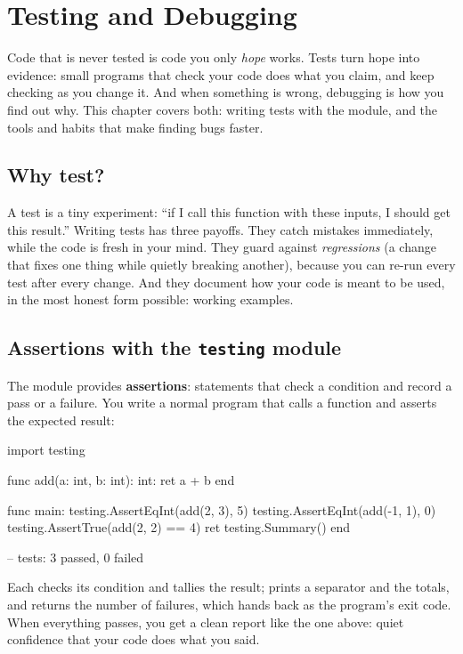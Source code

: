 \chapter{Testing and Debugging}%
\label{ch:testing-debugging}

Code that is never tested is code you only \emph{hope} works. Tests turn hope into
evidence: small programs that check your code does what you claim, and keep
checking as you change it. And when something is wrong, debugging is how you find
out why. This chapter covers both: writing tests with the  module,
and the tools and habits that make finding bugs faster.

\section{Why test?}

A test is a tiny experiment: ``if I call this function with these inputs, I should
get this result.'' Writing tests has three payoffs. They catch mistakes
immediately, while the code is fresh in your mind. They guard against
\emph{regressions} (a change that fixes one thing while quietly breaking
another), because you can re-run every test after every change. And they document
how your code is meant to be used, in the most honest form possible: working
examples.

\section{Assertions with the \texttt{testing} module}

The  module provides \textbf{assertions}: statements that check a
condition and record a pass or a failure. You write a normal program that calls a
function and asserts the expected result:

\begin{salamen}
import testing

func add(a: int, b: int): int:
    ret a + b
end

func main:
    testing.AssertEqInt(add(2, 3), 5)
    testing.AssertEqInt(add(-1, 1), 0)
    testing.AssertTrue(add(2, 2) == 4)
    ret testing.Summary()
end
\end{salamen}

\begin{progout}
--
tests: 3 passed, 0 failed
\end{progout}

Each  checks its condition and tallies the result;  prints a \code{--} separator and the totals, and returns the number of
failures, which  hands back as the program's exit code. When everything
passes, you get a clean report like the one above: quiet confidence that your code does what you said.

